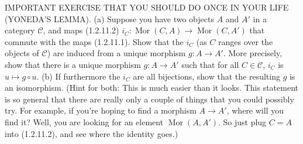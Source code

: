 IMPORTANT EXERCISE THAT YOU SHOULD DO ONCE IN YOUR LIFE (YONEDA'S LEMMA). (a) Suppose you have two objects $A$ and $A'$ in a category $\mathcal{C}$, and maps (1.2.11.2) $i_C : \operatorname{Mor}(C,A) \to \operatorname{Mor}(C,A')$ that commute with the maps (1.2.11.1). Show that the $i_C$ (as $C$ ranges over the objects of $\mathcal{C}$) are induced from a unique morphism $g : A \to A'$. More precisely, show that there is a unique morphism $g : A \to A'$ such that for all $C \in \mathcal{C}$, $i_C$ is $u \mapsto g \circ u$. (b) If furthermore the $i_C$ are all bijections, show that the resulting $g$ is an isomorphism. (Hint for both: This is much easier than it looks. This statement is so general that there are really only a couple of things that you could possibly try. For example, if you're hoping to find a morphism $A \to A'$, where will you find it? Well, you are looking for an element $\operatorname{Mor}(A,A')$. So just plug $C=A$ into (1.2.11.2), and see where the identity goes.)
